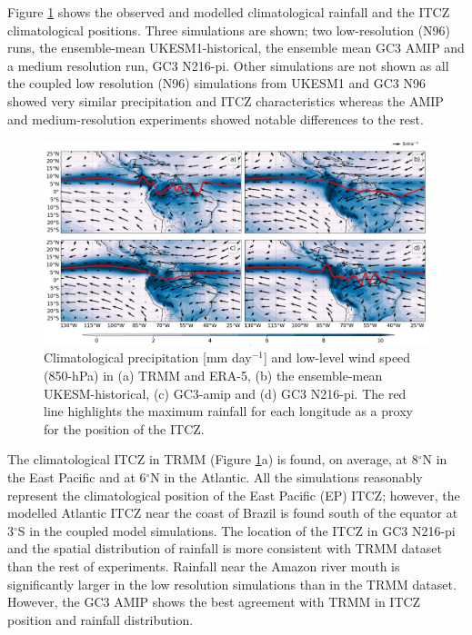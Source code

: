 Figure \ref{fig:3} shows the observed and modelled climatological rainfall and the ITCZ climatological positions. Three simulations are shown; two low-resolution (N96) runs, the ensemble-mean UKESM1-historical, the ensemble mean GC3 AMIP and a medium resolution run, GC3 N216-pi.
Other simulations are not shown as all the coupled low resolution (N96) simulations from UKESM1 and GC3 N96 showed very similar precipitation and ITCZ characteristics whereas the AMIP and medium-resolution experiments showed notable differences to the rest. 

\begin{figure}[t!]
\centering
 \includegraphics[width=\linewidth]{figures/itcz_clim_d.png}
\caption[Climatological precipitation and ITCZ position]{ Climatological precipitation [mm day$^{-1}$] and low-level wind speed (850-hPa) in (a) TRMM and ERA-5, (b) the ensemble-mean UKESM-historical, (c) GC3-amip and (d) GC3 N216-pi. The red line highlights the maximum rainfall for each longitude as a proxy for the position of the ITCZ.  }
\label{fig:3}
\end{figure}

The climatological ITCZ in TRMM (Figure \ref{fig:3}a) is found, on average, at 8$^\circ$N in the East Pacific and at 6$^\circ$N in the Atlantic.
All the simulations reasonably represent the climatological position of the East Pacific (EP) ITCZ; however, the modelled Atlantic ITCZ near the coast of Brazil is found south of the equator at 3$^\circ$S in the coupled model simulations.
The location of the ITCZ in GC3 N216-pi and the spatial distribution of rainfall is more consistent with TRMM dataset than the rest of experiments.
Rainfall near the Amazon river mouth is significantly larger in the low resolution simulations than in the TRMM dataset. 
 However, the GC3 AMIP shows the best agreement with TRMM in ITCZ position and rainfall distribution. 

